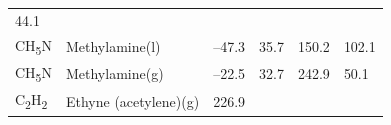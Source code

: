 \documentclass[
  9pt,
]{extbook}
\theoremstyle{definition}
\theoremstyle{definition}
\theoremstyle{definition}
\theoremstyle{remark}
\begin{document}
\begin{longtable}[]{@{}llllll@{}}
\begin{minipage}[t]{0.14\columnwidth}
44.1\strut
\end{minipage}\tabularnewline
\begin{minipage}[t]{0.07\columnwidth}\raggedright
CH\textsubscript{5}N\strut
\end{minipage} & \begin{minipage}[t]{0.17\columnwidth}\raggedright
Methylamine(l)\strut
\end{minipage} & \begin{minipage}[t]{0.15\columnwidth}\raggedright
--47.3\strut
\end{minipage} & \begin{minipage}[t]{0.15\columnwidth}\raggedright
35.7\strut
\end{minipage} & \begin{minipage}[t]{0.14\columnwidth}\raggedright
150.2\strut
\end{minipage} & \begin{minipage}[t]{0.14\columnwidth}\raggedright
102.1\strut
\end{minipage}\tabularnewline
\begin{minipage}[t]{0.07\columnwidth}\raggedright
CH\textsubscript{5}N\strut
\end{minipage} & \begin{minipage}[t]{0.17\columnwidth}\raggedright
Methylamine(g)\strut
\end{minipage} & \begin{minipage}[t]{0.15\columnwidth}\raggedright
--22.5\strut
\end{minipage} & \begin{minipage}[t]{0.15\columnwidth}\raggedright
32.7\strut
\end{minipage} & \begin{minipage}[t]{0.14\columnwidth}\raggedright
242.9\strut
\end{minipage} & \begin{minipage}[t]{0.14\columnwidth}\raggedright
50.1\strut
\end{minipage}\tabularnewline
\begin{minipage}[t]{0.07\columnwidth}\raggedright
C\textsubscript{2}H\textsubscript{2}\strut
\end{minipage} & \begin{minipage}[t]{0.17\columnwidth}\raggedright
Ethyne (acetylene)(g)\strut
\end{minipage} & \begin{minipage}[t]{0.15\columnwidth}\raggedright
226.9\strut
\end{minipage} & \begin{minipage}[t]{0.15\columnwidth}\raggedright

\end{minipage}
\end{longtable}
\end{document}
